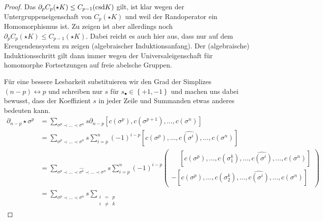   \begin{proof}
    Das \( \partial_{p} C_{p}(\star K) \le C_{p-1}(\text{csd} K) \) gilt, ist klar wegen der Untergruppeneigenschaft von \( C_{p}(\star K) \) und weil der Randoperator ein Homomorphismus ist.
    Zu zeigen ist aber allerdings noch \( \partial_{p} C_{p}(\star K) \le C_{p-1}(\star K) \). 
    Dabei reicht es auch hier aus, dass nur auf dem Ereugendensystem zu zeigen (algebraischer Induktionsanfang).
    Der (algebraische) Induktionsschritt gilt dann immer wegen der Universaleigenschaft für homomorphe Fortsetzungen auf freie abelsche Gruppen.

    Für eine bessere Lesbarkeit substituieren wir den Grad der Simplizes \( (n-p) \leftrightarrow p \) und schreiben nur \( s \) für \( s_{\bullet} \in \left\{ +1,-1 \right\} \)
    und machen uns dabei bewusst, dass der Koeffizient \( s \) in jeder Zeile und Summanden etwas anderes bedeuten kann.
    \begin{align}
      \partial_{n-p}\star\sigma^{p} &= \sum_{\sigma^{p}\prec\ldots\prec\sigma^{n}} s \partial_{n-p} \left[ c(\sigma^{p}), c(\sigma^{p+1}),\ldots, c(\sigma^{n})\right] \label{eqproof1}\\
                              &= \sum_{\sigma^{p}\prec\ldots\prec\sigma^{n}} s 
                                          \sum_{i=p}^{n} (-1)^{i-p} \left[ c(\sigma^{p}),\ldots, \widehat{c(\sigma^{i})},\ldots, c(\sigma^{n})\right] \label{eqproof2}\\
                              &= \sum_{\sigma^{p}\prec\ldots\prec\widehat{\sigma^{k}}\prec\ldots\prec\sigma^{n}} s
                                          \sum_{i=p}^{n} (-1)^{i-p} 
                              \left(\begin{aligned}
                                            \phantom{-}\left[ c(\sigma^{p}),\ldots, c(\sigma_{1}^{k}),\ldots,\widehat{c(\sigma^{i})},\ldots, c(\sigma^{n})\right] \\
                                                     - \left[ c(\sigma^{p}),\ldots, c(\sigma_{2}^{k}),\ldots,\widehat{c(\sigma^{i})},\ldots, c(\sigma^{n})\right]
                              \end{aligned}\right) \label{eqproof3}\\
                              &= \sum_{\sigma^{p}\prec\ldots\prec\sigma^{n}} s 
                                          \sum_{\begin{smallmatrix}
                                                  i & = & p \\
                                                  i & \neq & k

\end{smallmatrix}}
\end{align}
\end{proof}
